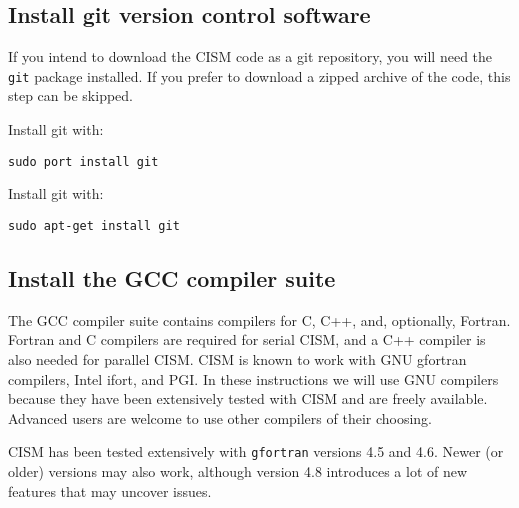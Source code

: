 \subsection{Install git version control software}
If you intend to download the CISM code as a git repository, you will need the \texttt{git} package installed.
If you prefer to download a zipped archive of the code, this step can be skipped.


\begin{mdframed}[style=mac] %
Install git with:

\texttt{sudo port install git}
\end{mdframed}              %


\begin{mdframed}[style=ubuntu] %
Install git with:

\texttt{sudo apt-get install git}
\end{mdframed}                 %


\subsection{Install the GCC compiler suite}

The GCC compiler suite contains compilers for C, C++, and, optionally, Fortran.
Fortran and C compilers are required for serial CISM, and a C++ compiler is also
needed for parallel CISM.  CISM is known to work with GNU gfortran compilers, 
Intel ifort, and PGI.  In these instructions we will use GNU compilers because they
have been extensively tested with CISM and are freely available.  Advanced users
are welcome to use other compilers of their choosing.

CISM has been tested extensively with \texttt{gfortran} versions 4.5 and 4.6.
Newer (or older) versions may also work, although version 4.8 introduces a lot of 
new features that may uncover issues.

